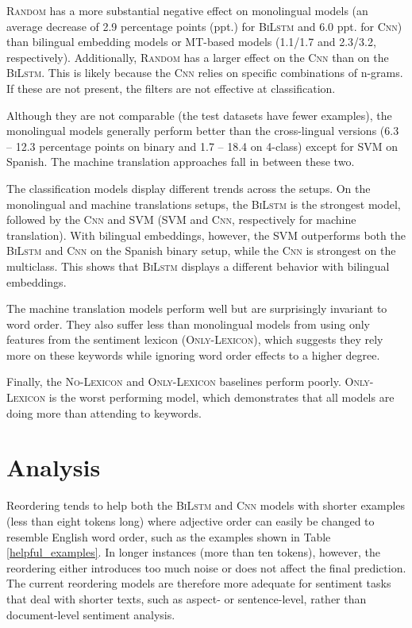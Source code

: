 \documentclass[a4paper,11pt,twocolumn,twoside]{article}
\newcommand{\random}{\textsc{Random}\xspace}
\newcommand{\onlylex}{\textsc{Only-Lexicon}\xspace}
\newcommand{\nolex}{\textsc{No-Lexicon}\xspace}
\newcommand{\bilstm}{\textsc{BiLstm}\xspace}
\newcommand{\cnn}{\textsc{Cnn}\xspace}
\begin{document}
\random has a more substantial negative effect on monolingual models (an average decrease of 2.9 percentage points (ppt.) for \bilstm and 6.0 ppt. for \cnn) than bilingual embedding models or MT-based models (1.1/1.7 and 2.3/3.2, respectively). Additionally, \random has a larger effect on the \cnn than on the \bilstm. This is likely because the \cnn relies on specific combinations of n-grams. If these are not present, the filters are not effective at classification.

Although they are not comparable (the test datasets have fewer examples), the monolingual models generally perform better than the cross-lingual versions (6.3 -- 12.3 percentage points on binary and 1.7 -- 18.4 on 4-class) except for SVM on Spanish. The machine translation approaches fall in between these two.

The classification models display different trends across the setups. On the monolingual and machine translations setups, the \bilstm is the strongest model, followed by the \cnn and SVM (SVM and \cnn, respectively for machine translation). With bilingual embeddings, however, the SVM outperforms both the \bilstm and \cnn on the Spanish binary setup, while the \cnn is strongest on the multiclass.  This shows that \bilstm displays a different behavior with bilingual embeddings.

The machine translation models perform well but are surprisingly invariant to word order. They also suffer less than monolingual models from using only features from the sentiment lexicon (\onlylex), which suggests they rely more on these keywords while ignoring word order effects to a higher degree.

Finally, the \nolex and \onlylex baselines perform poorly. \onlylex is the worst performing model, which demonstrates that all models are doing more than attending to keywords.



\section{Analysis}

Reordering tends to help both the \bilstm and \cnn models with shorter examples (less than eight tokens long) where adjective order can easily be changed to resemble English word order, such as the examples shown in Table \ref{helpful_examples}. In longer instances (more than ten tokens), however, the reordering either introduces too much noise or does not affect the final prediction. The current reordering models are therefore more adequate for sentiment tasks that deal with shorter texts, such as aspect- or sentence-level, rather than document-level sentiment analysis.
\end{document}
